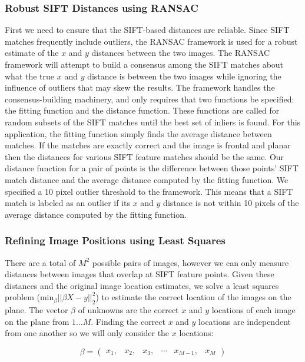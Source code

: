 \documentclass[10pt,twocolumn,letterpaper]{article}
\begin{document}
\subsubsection{Robust SIFT Distances using RANSAC}

First we need to ensure that the SIFT-based distances are
reliable. Since SIFT matches frequently include outliers, the RANSAC
framework \cite{fischler1981random} is used for a robust estimate of
the $x$ and $y$ distances between the two images. The RANSAC framework
will attempt to build a consensus among the SIFT matches about what
the true $x$ and $y$ distance is between the two images while ignoring
the influence of outliers that may skew the results. The framework
handles the consensus-building machinery, and only requires that two
functions be specified: the fitting function and the distance
function. These functions are called for random subsets of the SIFT
matches until the best set of inliers is found. For this application,
the fitting function simply finds the average distance between
matches. If the matches are exactly correct and the image is frontal
and planar then the distances for various SIFT feature matches should
be the same. Our distance function for a pair of points is the
difference between those points' SIFT match distance and the average
distance computed by the fitting function. We specified a 10 pixel
outlier threshold to the framework. This means that a SIFT match is
labeled as an outlier if its $x$ and $y$ distance is not within 10
pixels of the average distance computed by the fitting function.

\subsubsection{Refining Image Positions using Least Squares}

There are a total of $M^{2}$ possible pairs of images, however we can
only measure distances between images that overlap at SIFT feature
points. Given these distances and the original image location
estimates, we solve a least squares problem ($\textrm{min}_{\beta}
||\beta X - y||_2^2 $) to estimate the correct location of the images
on the plane. The vector $\beta$ of unknowns are the correct $x$ and
$y$ locations of each image on the plane from $1 \dots M$. Finding the
correct $x$ and $y$ locations are independent from one another so we
will only consider the $x$ locations:


\[\beta =
\begin{pmatrix}
  x_1, & x_2, & x_3, & \cdots & x_{M-1}, & x_M
\end{pmatrix}
\]
\end{document}

